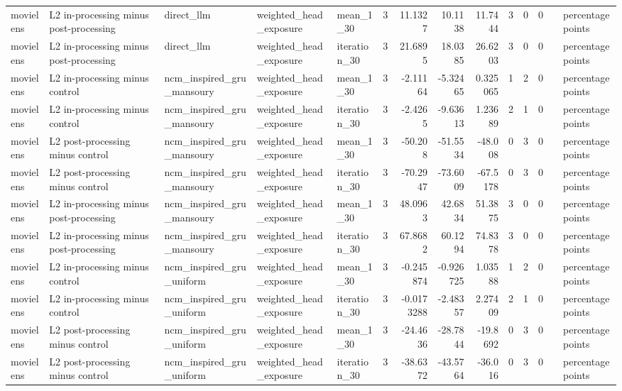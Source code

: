 \begin{table}[htbp!]
\begin{tabular}{lllllrrrrrrrll}
movielens & L2 in-processing minus post-processing & direct\_llm & weighted\_head\_exposure & mean\_1\_30 & 3 & 11.1327 & 10.1138 & 11.7444 & 3 & 0 & 0 &  & percentage points \\
movielens & L2 in-processing minus post-processing & direct\_llm & weighted\_head\_exposure & iteration\_30 & 3 & 21.6895 & 18.0385 & 26.6203 & 3 & 0 & 0 &  & percentage points \\
movielens & L2 in-processing minus control & ncm\_inspired\_gru\_mansoury & weighted\_head\_exposure & mean\_1\_30 & 3 & -2.11164 & -5.32465 & 0.325065 & 1 & 2 & 0 &  & percentage points \\
movielens & L2 in-processing minus control & ncm\_inspired\_gru\_mansoury & weighted\_head\_exposure & iteration\_30 & 3 & -2.4265 & -9.63613 & 1.23689 & 2 & 1 & 0 &  & percentage points \\
movielens & L2 post-processing minus control & ncm\_inspired\_gru\_mansoury & weighted\_head\_exposure & mean\_1\_30 & 3 & -50.208 & -51.5534 & -48.008 & 0 & 3 & 0 &  & percentage points \\
movielens & L2 post-processing minus control & ncm\_inspired\_gru\_mansoury & weighted\_head\_exposure & iteration\_30 & 3 & -70.2947 & -73.6009 & -67.5178 & 0 & 3 & 0 &  & percentage points \\
movielens & L2 in-processing minus post-processing & ncm\_inspired\_gru\_mansoury & weighted\_head\_exposure & mean\_1\_30 & 3 & 48.0963 & 42.6834 & 51.3875 & 3 & 0 & 0 &  & percentage points \\
movielens & L2 in-processing minus post-processing & ncm\_inspired\_gru\_mansoury & weighted\_head\_exposure & iteration\_30 & 3 & 67.8682 & 60.1294 & 74.8378 & 3 & 0 & 0 &  & percentage points \\
movielens & L2 in-processing minus control & ncm\_inspired\_gru\_uniform & weighted\_head\_exposure & mean\_1\_30 & 3 & -0.245874 & -0.926725 & 1.03588 & 1 & 2 & 0 &  & percentage points \\
movielens & L2 in-processing minus control & ncm\_inspired\_gru\_uniform & weighted\_head\_exposure & iteration\_30 & 3 & -0.0173288 & -2.48357 & 2.27409 & 2 & 1 & 0 &  & percentage points \\
movielens & L2 post-processing minus control & ncm\_inspired\_gru\_uniform & weighted\_head\_exposure & mean\_1\_30 & 3 & -24.4636 & -28.7844 & -19.8692 & 0 & 3 & 0 &  & percentage points \\
movielens & L2 post-processing minus control & ncm\_inspired\_gru\_uniform & weighted\_head\_exposure & iteration\_30 & 3 & -38.6372 & -43.5764 & -36.016 & 0 & 3 & 0 &  & percentage points \\

\end{tabular}
\end{table}
